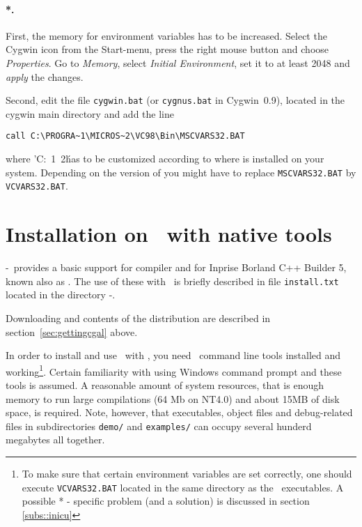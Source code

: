 \paragraph{*.} 

First, the memory for environment variables has to be increased.
Select the Cygwin icon from the Start-menu, press the right mouse
button and choose \textit{Properties}. Go to \textit{Memory}, select
\textit{Initial Environment}, set it to at least 2048 and
\textit{apply} the changes.

Second, edit the file \texttt{cygwin.bat} (or \texttt{cygnus.bat} in
Cygwin~0.9), located in the cygwin main directory and add the line
\begin{verbatim}
call C:\PROGRA~1\MICROS~2\VC98\Bin\MSCVARS32.BAT
\end{verbatim}
where
\nonlinkedpath'C:\PROGRA~1\MICROS~2\'
has to be customized according to where \msvc{} is installed on your
system. Depending on the version of \msvc{} you might have to replace
\texttt{MSCVARS32.BAT} by \texttt{VCVARS32.BAT}.

\section{Installation on \mswin\ with native tools} \label{sec:wininst}

\cgal-\cgalrelease\ provides a basic support for  compiler
and for Inprise Borland C++ Builder 5, known also as .  The
use of these with \cgal\ is briefly described in file
\texttt{install.txt} located in the directory \cgal-\cgalrelease.

Downloading and contents of the distribution are described in 
section~\ref{sec:gettingcgal} above.

In order to install and use \cgal\ with \msvc , you need \msvc\ 
command line tools installed and working\footnote{To make sure that
  certain environment variables are set correctly, one should execute
  \texttt{VCVARS32.BAT} located in the same directory as the \msvc\ 
  executables. A possible * - specific problem (and a
  solution) is discussed in section \ref{subs::inicu}}. 
Certain familiarity with using Windows command prompt
and these tools is assumed. A reasonable amount of system resources,
that is enough memory to run large compilations (64 Mb on NT4.0) and
about 15MB of disk space, is required. Note, however, that 
executables, object files and debug-related files in subdirectories
\texttt{demo/} and \texttt{examples/} can occupy several hunderd
megabytes all together.

